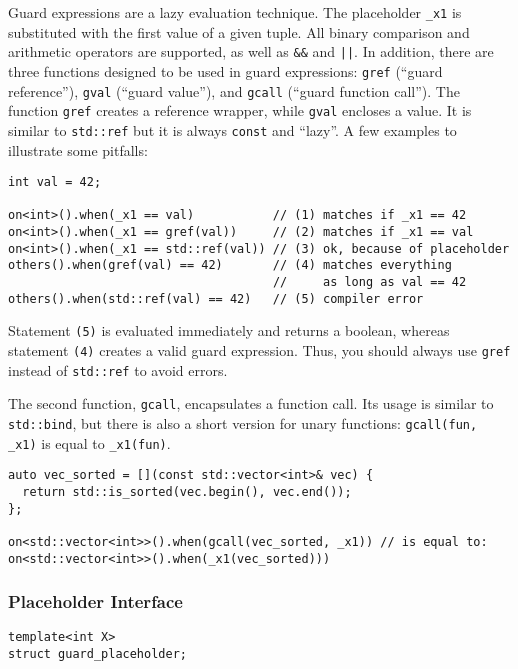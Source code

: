 Guard expressions are a lazy evaluation technique.
The placeholder \lstinline^_x1^ is substituted with the first value of a given tuple.
All binary comparison and arithmetic operators are supported, as well as \lstinline^&&^ and \lstinline^||^.
In addition, there are three functions designed to be used in guard expressions: \lstinline^gref^ (``guard reference''), \lstinline^gval^ (``guard value''), and \lstinline^gcall^ (``guard function call'').
The function \lstinline^gref^ creates a reference wrapper, while \lstinline^gval^ encloses a value.
It is similar to \lstinline^std::ref^ but it is always \lstinline^const^ and ``lazy''.
A few examples to illustrate some pitfalls:

\begin{lstlisting}
int val = 42;

on<int>().when(_x1 == val)           // (1) matches if _x1 == 42
on<int>().when(_x1 == gref(val))     // (2) matches if _x1 == val
on<int>().when(_x1 == std::ref(val)) // (3) ok, because of placeholder
others().when(gref(val) == 42)       // (4) matches everything
                                     //     as long as val == 42
others().when(std::ref(val) == 42)   // (5) compiler error
\end{lstlisting}

Statement \texttt{(5)} is evaluated immediately and returns a boolean, whereas statement \texttt{(4)} creates a valid guard expression.
Thus, you should always use \lstinline^gref^ instead of \lstinline^std::ref^ to avoid errors.

The second function, \lstinline^gcall^, encapsulates a function call.
Its usage is similar to \lstinline^std::bind^, but there is also a short version for unary functions: \lstinline^gcall(fun, _x1)^ is equal to \lstinline^_x1(fun)^.

\begin{lstlisting}
auto vec_sorted = [](const std::vector<int>& vec) {
  return std::is_sorted(vec.begin(), vec.end());
};

on<std::vector<int>>().when(gcall(vec_sorted, _x1)) // is equal to:
on<std::vector<int>>().when(_x1(vec_sorted)))
\end{lstlisting}

\subsubsection{Placeholder Interface}

\begin{lstlisting}
template<int X>
struct guard_placeholder;
\end{lstlisting}

